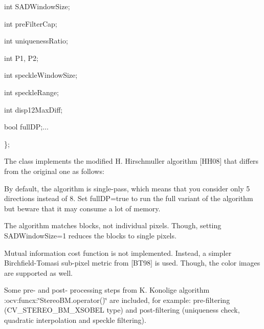 {\ttfamily }

{\ttfamily int S\+A\+D\+Window\+Size;}

{\ttfamily }

{\ttfamily }

{\ttfamily int pre\+Filter\+Cap;}

{\ttfamily }

{\ttfamily }

{\ttfamily int uniqueness\+Ratio;}

{\ttfamily }

{\ttfamily }

{\ttfamily int P1, P2;}

{\ttfamily }

{\ttfamily }

{\ttfamily int speckle\+Window\+Size;}

{\ttfamily }

{\ttfamily }

{\ttfamily int speckle\+Range;}

{\ttfamily }

{\ttfamily }

{\ttfamily int disp12\+Max\+Diff;}

{\ttfamily }

{\ttfamily }

{\ttfamily bool full\+DP;...}

{\ttfamily }

{\ttfamily }

{\ttfamily \};}

{\ttfamily }

{\ttfamily }

{\ttfamily The class implements the modified H. Hirschmuller algorithm \mbox{[}H\+H08\mbox{]} that differs from the original one as follows\+: }


\begin{DoxyItemize}
\item By default, the algorithm is single-\/pass, which means that you consider only 5 directions instead of 8. Set {\ttfamily full\+DP=true} to run the full variant of the algorithm but beware that it may consume a lot of memory. 
\item The algorithm matches blocks, not individual pixels. Though, setting {\ttfamily S\+A\+D\+Window\+Size=1} reduces the blocks to single pixels. 
\item Mutual information cost function is not implemented. Instead, a simpler Birchfield-\/\+Tomasi sub-\/pixel metric from \mbox{[}B\+T98\mbox{]} is used. Though, the color images are supported as well. 
\item Some pre-\/ and post-\/ processing steps from K. Konolige algorithm \+:ocv\+:funcx\+:\char`\"{}\+Stereo\+B\+M.\+operator()\char`\"{} are included, for example\+: pre-\/filtering ({\ttfamily C\+V\+\_\+\+S\+T\+E\+R\+E\+O\+\_\+\+B\+M\+\_\+\+X\+S\+O\+B\+EL} type) and post-\/filtering (uniqueness check, quadratic interpolation and speckle filtering). 
\end{DoxyItemize}

